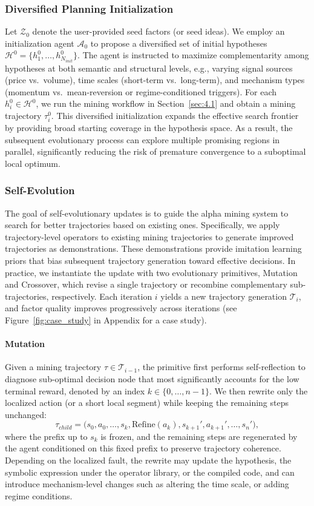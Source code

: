 \subsubsection{Diversified Planning Initialization}
\label{sec:4.2.1}
Let $\mathcal{Z}_0$ denote the user-provided seed factors (or seed ideas). 
We employ an initialization agent $\mathcal{A}_0$ to propose a diversified set of initial hypotheses $\mathcal{H}^{0}=\{h^{0}_1,\ldots,h^{0}_{N_{init}}\}$. The agent is instructed to maximize complementarity among hypotheses at both semantic and structural levels, e.g., varying signal sources (price vs.\ volume), time scales (short-term vs.\ long-term), and mechanism types (momentum vs.\ mean-reversion or regime-conditioned triggers). For each $h^{0}_i \in \mathcal{H}^{0}$, we run the mining workflow in Section~\ref{sec:4.1} and obtain a mining trajectory $\tau^{0}_i$.
This diversified initialization expands the effective search frontier by providing broad starting coverage in the hypothesis space. As a result, the subsequent evolutionary process can explore multiple promising regions in parallel, significantly reducing the risk of premature convergence to a suboptimal local optimum.
\subsubsection{Self-Evolution}
\label{sec:4.2.2}
The goal of self-evolutionary updates is to guide the alpha mining system to search for better trajectories based on existing ones. Specifically, we apply trajectory-level operators to existing mining trajectories to generate improved trajectories as demonstrations. These demonstrations provide imitation learning priors that bias subsequent trajectory generation toward effective decisions. In practice, we instantiate the update with two evolutionary primitives, Mutation and Crossover, which revise a single trajectory or recombine complementary sub-trajectories, respectively. Each iteration $i$ yields a new trajectory generation $\mathcal{T}_i$, and factor quality improves progressively across iterations (see Figure~\ref{fig:case_study} in Appendix for a case study).
\paragraph{Mutation}
Given a mining trajectory $\tau \in \mathcal{T}_{i-1}$, the primitive first performs self-reflection to diagnose sub-optimal decision node that most significantly accounts for the low terminal reward,
denoted by an index $k\in\{0,\ldots,n-1\}$. 
We then rewrite only the localized action (or a short local segment) while keeping the remaining steps unchanged:
\begin{equation}
\tau_{child}=\big(s_0,a_0,\ldots,s_k,\mathrm{Refine}(a_k),s_{k+1}',a_{k+1}',\ldots,s_n'\big), 
\label{eq:controlled_mutation}
\end{equation}
where the prefix up to $s_k$ is frozen, and the remaining steps are regenerated by the agent conditioned on this fixed prefix to preserve trajectory coherence. Depending on the localized fault, the rewrite may update the hypothesis, the symbolic expression under the operator library, or the compiled code, and can introduce mechanism-level changes such as altering the time scale, or adding regime conditions.
